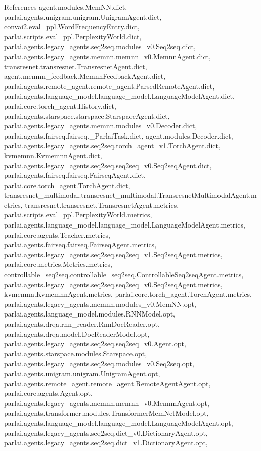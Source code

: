 References agent.\+modules.\+Mem\+N\+N.\+dict, parlai.\+agents.\+unigram.\+unigram.\+Unigram\+Agent.\+dict, convai2.\+eval\+\_\+ppl.\+Word\+Frequency\+Entry.\+dict, parlai.\+scripts.\+eval\+\_\+ppl.\+Perplexity\+World.\+dict, parlai.\+agents.\+legacy\+\_\+agents.\+seq2seq.\+modules\+\_\+v0.\+Seq2seq.\+dict, parlai.\+agents.\+legacy\+\_\+agents.\+memnn.\+memnn\+\_\+v0.\+Memnn\+Agent.\+dict, transresnet.\+transresnet.\+Transresnet\+Agent.\+dict, agent.\+memnn\+\_\+feedback.\+Memnn\+Feedback\+Agent.\+dict, parlai.\+agents.\+remote\+\_\+agent.\+remote\+\_\+agent.\+Parsed\+Remote\+Agent.\+dict, parlai.\+agents.\+language\+\_\+model.\+language\+\_\+model.\+Language\+Model\+Agent.\+dict, parlai.\+core.\+torch\+\_\+agent.\+History.\+dict, parlai.\+agents.\+starspace.\+starspace.\+Starspace\+Agent.\+dict, parlai.\+agents.\+legacy\+\_\+agents.\+memnn.\+modules\+\_\+v0.\+Decoder.\+dict, parlai.\+agents.\+fairseq.\+fairseq.\+\_\+\+Parlai\+Task.\+dict, agent.\+modules.\+Decoder.\+dict, parlai.\+agents.\+legacy\+\_\+agents.\+seq2seq.\+torch\+\_\+agent\+\_\+v1.\+Torch\+Agent.\+dict, kvmemnn.\+Kvmemnn\+Agent.\+dict, parlai.\+agents.\+legacy\+\_\+agents.\+seq2seq.\+seq2seq\+\_\+v0.\+Seq2seq\+Agent.\+dict, parlai.\+agents.\+fairseq.\+fairseq.\+Fairseq\+Agent.\+dict, parlai.\+core.\+torch\+\_\+agent.\+Torch\+Agent.\+dict, transresnet\+\_\+multimodal.\+transresnet\+\_\+multimodal.\+Transresnet\+Multimodal\+Agent.\+metrics, transresnet.\+transresnet.\+Transresnet\+Agent.\+metrics, parlai.\+scripts.\+eval\+\_\+ppl.\+Perplexity\+World.\+metrics, parlai.\+agents.\+language\+\_\+model.\+language\+\_\+model.\+Language\+Model\+Agent.\+metrics, parlai.\+core.\+agents.\+Teacher.\+metrics, parlai.\+agents.\+fairseq.\+fairseq.\+Fairseq\+Agent.\+metrics, parlai.\+agents.\+legacy\+\_\+agents.\+seq2seq.\+seq2seq\+\_\+v1.\+Seq2seq\+Agent.\+metrics, parlai.\+core.\+metrics.\+Metrics.\+metrics, controllable\+\_\+seq2seq.\+controllable\+\_\+seq2seq.\+Controllable\+Seq2seq\+Agent.\+metrics, parlai.\+agents.\+legacy\+\_\+agents.\+seq2seq.\+seq2seq\+\_\+v0.\+Seq2seq\+Agent.\+metrics, kvmemnn.\+Kvmemnn\+Agent.\+metrics, parlai.\+core.\+torch\+\_\+agent.\+Torch\+Agent.\+metrics, parlai.\+agents.\+legacy\+\_\+agents.\+memnn.\+modules\+\_\+v0.\+Mem\+N\+N.\+opt, parlai.\+agents.\+language\+\_\+model.\+modules.\+R\+N\+N\+Model.\+opt, parlai.\+agents.\+drqa.\+rnn\+\_\+reader.\+Rnn\+Doc\+Reader.\+opt, parlai.\+agents.\+drqa.\+model.\+Doc\+Reader\+Model.\+opt, parlai.\+agents.\+legacy\+\_\+agents.\+seq2seq.\+seq2seq\+\_\+v0.\+Agent.\+opt, parlai.\+agents.\+starspace.\+modules.\+Starspace.\+opt, parlai.\+agents.\+legacy\+\_\+agents.\+seq2seq.\+modules\+\_\+v0.\+Seq2seq.\+opt, parlai.\+agents.\+unigram.\+unigram.\+Unigram\+Agent.\+opt, parlai.\+agents.\+remote\+\_\+agent.\+remote\+\_\+agent.\+Remote\+Agent\+Agent.\+opt, parlai.\+core.\+agents.\+Agent.\+opt, parlai.\+agents.\+legacy\+\_\+agents.\+memnn.\+memnn\+\_\+v0.\+Memnn\+Agent.\+opt, parlai.\+agents.\+transformer.\+modules.\+Transformer\+Mem\+Net\+Model.\+opt, parlai.\+agents.\+language\+\_\+model.\+language\+\_\+model.\+Language\+Model\+Agent.\+opt, parlai.\+agents.\+legacy\+\_\+agents.\+seq2seq.\+dict\+\_\+v0.\+Dictionary\+Agent.\+opt, parlai.\+agents.\+legacy\+\_\+agents.\+seq2seq.\+dict\+\_\+v1.\+Dictionary\+Agent.\+opt, 